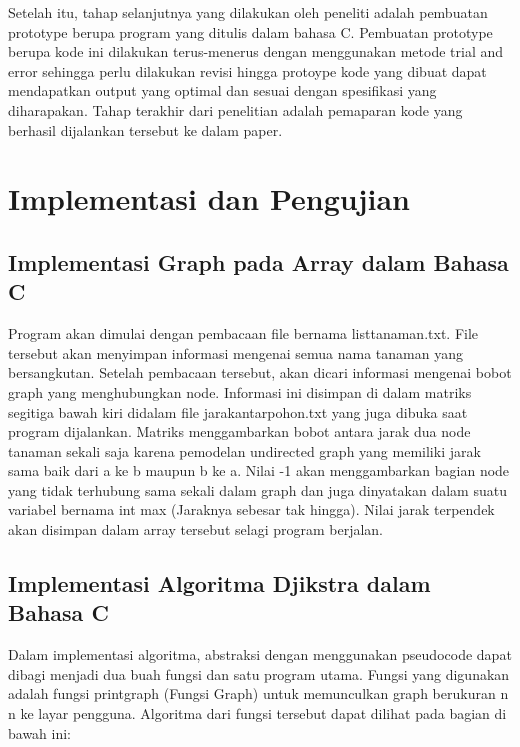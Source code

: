 \documentclass[conference]{IEEEtran}
\begin{document}
Setelah itu, tahap selanjutnya yang dilakukan oleh peneliti
adalah pembuatan prototype berupa program yang ditulis
dalam bahasa C. Pembuatan prototype berupa kode ini dilakukan
terus-menerus dengan menggunakan metode trial and
error sehingga perlu dilakukan revisi hingga protoype kode
yang dibuat dapat mendapatkan output yang optimal dan
sesuai dengan spesifikasi yang diharapakan. Tahap terakhir
dari penelitian adalah pemaparan kode yang berhasil dijalankan
tersebut ke dalam paper.

\begin{figure}[htp]
    \centering
\end{figure}

\section{Implementasi dan Pengujian}
\subsection{Implementasi Graph pada Array dalam Bahasa C}

Program akan dimulai dengan pembacaan file bernama
listtanaman.txt. File tersebut akan menyimpan informasi mengenai
semua nama tanaman yang bersangkutan. Setelah pembacaan
tersebut, akan dicari informasi mengenai bobot graph
yang menghubungkan node. Informasi ini disimpan di dalam
matriks segitiga bawah kiri didalam file jarakantarpohon.txt
yang juga dibuka saat program dijalankan. Matriks menggambarkan
bobot antara jarak dua node tanaman sekali saja karena
pemodelan undirected graph yang memiliki jarak sama baik
dari a ke b maupun b ke a. Nilai -1 akan menggambarkan
bagian node yang tidak terhubung sama sekali dalam graph
dan juga dinyatakan dalam suatu variabel bernama int max
(Jaraknya sebesar tak hingga). Nilai jarak terpendek akan
disimpan dalam array tersebut selagi program berjalan.



\subsection{Implementasi Algoritma Djikstra dalam Bahasa C}
Dalam implementasi algoritma, abstraksi dengan menggunakan
pseudocode dapat dibagi menjadi dua buah fungsi dan
satu program utama. Fungsi yang digunakan adalah fungsi
printgraph (Fungsi Graph) untuk memunculkan graph berukuran
n  n ke layar pengguna. Algoritma dari fungsi tersebut
dapat dilihat pada bagian di bawah ini:
\end{document}
